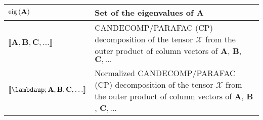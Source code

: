 \documentclass{article}
\begin{document}
\begin{xltabular}{\textwidth}{XX}
    \(\operatorname{eig}\left(\mathbf{A}\right)\)                                                                          & Set of the eigenvalues of \(\mathbf{A}\) \cite{chellappaSignalProcessingTheory2014,leon-garciaProbabilityStatisticsRandom2007,petersenMatrixCookbook2008}\\ \hline
    \(\llbracket \mathbf{A}, \mathbf{B}, \mathbf{C}, \dots \rrbracket\)                           & CANDECOMP/PARAFAC (CP) decomposition of the tensor \(\bm{\mathcal{X}}\) from the outer product of column vectors of \(\mathbf{A}\), \(\mathbf{B}\), \(\mathbf{C}, \dots\)\\ \hline
    \(\llbracket \boldsymbol{\lambdaup}; \mathbf{A}, \mathbf{B}, \mathbf{C}, \dots \rrbracket\)   & Normalized CANDECOMP/PARAFAC (CP) decomposition of the tensor \(\bm{\mathcal{X}}\) from the outer product of column vectors of \(\mathbf{A}\), \(\mathbf{B}\), \(\mathbf{C}, \dots\)\\
\end{xltabular}
\end{document}
